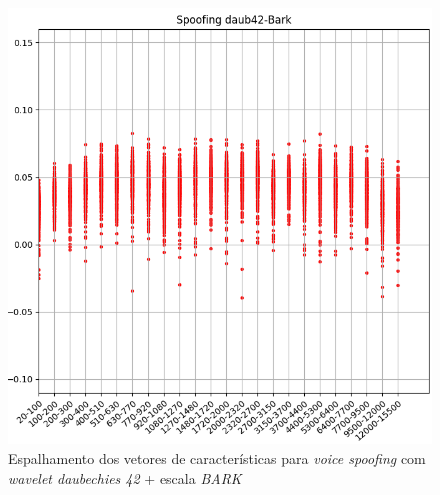		\begin{figure}[!h]
			\centering
			\includegraphics[width=.70\linewidth, height=.68\linewidth]{images/results/barkVersusMel/spoofingDaub42Bark}
			\caption{Espalhamento dos vetores de características para \textit{voice spoofing} com \textit{wavelet daubechies 42} + escala \textit{BARK} }
			\label{fig:spoofingdaub42bark}
		\end{figure}
		
